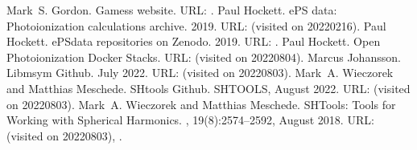 \documentclass[letterpaper,10pt,english]{jupyterBook}
\begin{document}
\begin{sphinxthebibliography}{10}
\sphinxAtStartPar
Mark S. Gordon. Gamess website. URL: .
\sphinxAtStartPar
Paul Hockett. ePS data: Photoionization calculations archive. 2019. URL:  (visited on 2022\sphinxhyphen{}02\sphinxhyphen{}16).
\sphinxAtStartPar
Paul Hockett. ePSdata repositories on Zenodo. 2019. URL: .
\sphinxAtStartPar
Paul Hockett. Open Photoionization Docker Stacks. URL:  (visited on 2022\sphinxhyphen{}08\sphinxhyphen{}04).
\sphinxAtStartPar
Marcus Johansson. Libmsym Github. July 2022. URL:  (visited on 2022\sphinxhyphen{}08\sphinxhyphen{}03).
\sphinxAtStartPar
Mark A. Wieczorek and Matthias Meschede. SHtools Github. SHTOOLS, August 2022. URL:  (visited on 2022\sphinxhyphen{}08\sphinxhyphen{}03).
\sphinxAtStartPar
Mark A. Wieczorek and Matthias Meschede. SHTools: Tools for Working with Spherical Harmonics. , 19(8):2574–2592, August 2018. URL:  (visited on 2022\sphinxhyphen{}08\sphinxhyphen{}03), .
\end{sphinxthebibliography}







\renewcommand{\indexname}{Index}
\printindex
\end{document}
